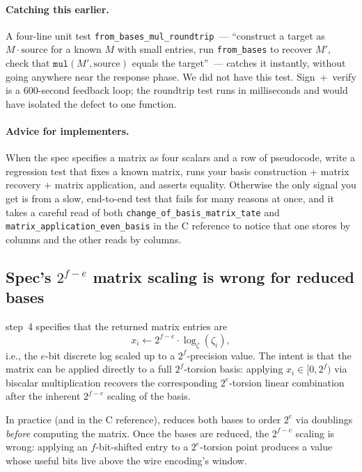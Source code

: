 \paragraph{Catching this earlier.}  A four-line unit test
\texttt{from\_bases\_mul\_roundtrip}~--- ``construct a target as
$M \cdot \mathrm{source}$ for a known $M$ with small entries, run
\texttt{from\_bases} to recover $M'$, check that $\texttt{mul}(M',
\mathrm{source})$ equals the target''~--- catches it instantly,
without going anywhere near the response phase.  We did not have
this test.  Sign~+~verify is a 600-second feedback loop; the
roundtrip test runs in milliseconds and would have isolated the
defect to one function.

\paragraph{Advice for implementers.}  When the spec specifies a
matrix as four scalars and a row of pseudocode, write a regression
test that fixes a known matrix, runs your basis construction +
matrix recovery + matrix application, and asserts equality.
Otherwise the only signal you get is from a slow, end-to-end test
that fails for many reasons at once, and it takes a careful read of
both \texttt{change\_of\_basis\_matrix\_tate} and
\texttt{matrix\_application\_even\_basis} in the C reference to
notice that one stores by columns and the other reads by columns.

\subsection{Spec's $2^{f-e}$ matrix scaling is wrong for reduced bases}
\label{sec:matrix-shift}

 step~4 specifies that the returned matrix entries are
\[
x_i \leftarrow 2^{f-e} \cdot \log_{\zeta}(\zeta_i),
\]
i.e., the $e$-bit discrete log scaled up to a $2^f$-precision value.
The intent is that the matrix can be applied directly to a full
$2^f$-torsion basis: applying $x_i \in [0, 2^f)$ via biscalar
multiplication recovers the corresponding $2^e$-torsion linear
combination after the inherent $2^{f-e}$ scaling of the basis.

In practice (and in the C reference),  reduces both bases
to order $2^e$ via doublings \emph{before} computing the matrix.
Once the bases are reduced, the $2^{f-e}$ scaling is wrong:
applying an $f$-bit-shifted entry to a $2^e$-torsion point produces
a value whose useful bits live above the wire encoding's window.

